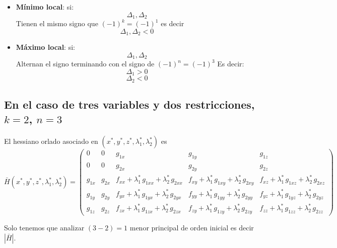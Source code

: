 \documentclass{article}
\begin{document}
\begin{itemize}\color{teal}
  \item \textbf{Mínimo local}: si:
  \begin{equation*}
   \Delta_1, \Delta_2 
  \end{equation*}
  Tienen el mismo signo que $(-1)^k=(-1)^1$ es decir
 \begin{equation*}
   \Delta_1, \Delta_2 <0
  \end{equation*}
 
  \item \textbf{Máximo local}:  si:
  \begin{equation*}
   \Delta_1, \Delta_2 
  \end{equation*}
  Alternan el signo terminando con el signo de $(-1)^n=(-1)^3$ Es decir:
   \begin{equation*}
   \Delta_1 >0 
  \end{equation*}
     \begin{equation*}
    \Delta_2 <0
  \end{equation*}
\end{itemize}



\subsection*{En el caso de tres variables y dos restricciones, \(k=2\), \(n=3\)}

El hessiano orlado asociado en \((x^*,y^*,z^*,\lambda_1^*,\lambda_2^*)\) es  
\[
\bar H(x^*,y^*,z^*,\lambda_1^*,\lambda_2^*)
=
\begin{pmatrix}
0 & 0 & g_{1x} & g_{1y} & g_{1z} \\[4pt]
0 & 0 & g_{2x} & g_{2y} & g_{2z} \\[4pt]
g_{1x} & g_{2x} & f_{xx}+\lambda_1^*\,g_{1xx}+\lambda_2^*\,g_{2xx} & f_{xy}+\lambda_1^*\,g_{1xy}+\lambda_2^*\,g_{2xy} & f_{xz}+\lambda_1^*\,g_{1xz}+\lambda_2^*\,g_{2xz} \\[4pt]
g_{1y} & g_{2y} & f_{yx}+\lambda_1^*\,g_{1yx}+\lambda_2^*\,g_{2yx} & f_{yy}+\lambda_1^*\,g_{1yy}+\lambda_2^*\,g_{2yy} & f_{yz}+\lambda_1^*\,g_{1yz}+\lambda_2^*\,g_{2yz} \\[4pt]
g_{1z} & g_{2z} & f_{zx}+\lambda_1^*\,g_{1zx}+\lambda_2^*\,g_{2zx} & f_{zy}+\lambda_1^*\,g_{1zy}+\lambda_2^*\,g_{2zy} & f_{zz}+\lambda_1^*\,g_{1zz}+\lambda_2^*\,g_{2zz}
\end{pmatrix}
\]

Solo tenemos que analizar $(3-2)=1$ menor principal de orden inicial es decir $|\bar{H}|$.
\end{document}
